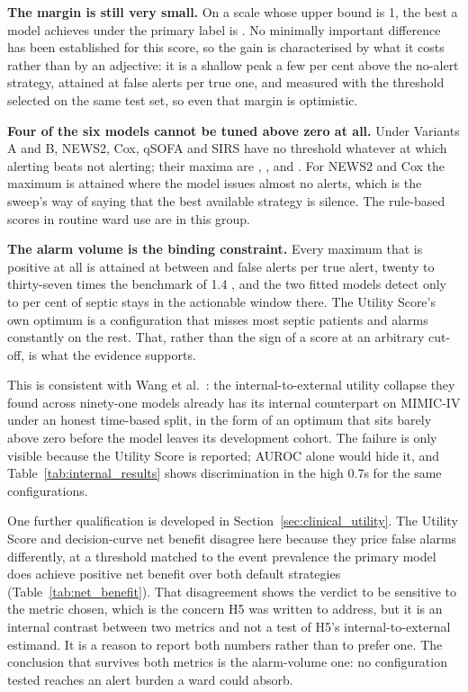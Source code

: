 \textbf{The margin is still very small.} On a scale whose upper bound is
1, the best a model achieves under the primary label is
\pcUtilityMaxGbtB{}. No minimally important difference has been established for
this score, so the gain is characterised by what it costs rather than by an
adjective: it is a shallow peak a few per cent above the no-alert strategy,
attained at \pcUtilityOptBurdenGbtB{} false alerts per true one, and measured
with the threshold selected on the same test set, so even that margin is
optimistic.

\textbf{Four of the six models cannot be tuned above zero at all.} Under
Variants A and B, NEWS2, Cox, qSOFA and SIRS have no threshold whatever at
which alerting beats not alerting; their maxima are
\pcUtilityMaxNewsB, \pcUtilityMaxCoxB, \pcUtilityMaxQsofaB{} and
\pcUtilityMaxSirsB. For NEWS2 and Cox the maximum is attained where the model
issues almost no alerts, which is the sweep's way of saying that the best
available strategy is silence. The rule-based scores in routine ward use are
in this group.

\textbf{The alarm volume is the binding constraint.} Every maximum that is
positive at all is attained at between \pcUtilityOptBurdenPrimaryC{} and
\pcUtilityOptBurdenGbtB{} false alerts per true alert, twenty to
thirty-seven times the benchmark of 1.4 \cite{moor2023review}, and the two
fitted models detect only \pcUtilityOptDetectPctPrimaryB{} to
\pcUtilityOptDetectPctGbtC{} per cent of septic stays in the actionable window
there. The Utility Score's own optimum is a configuration that misses most
septic patients and alarms constantly on the rest. That, rather than the sign
of a score at an arbitrary cut-off, is what the evidence supports.

This is consistent with Wang et al.\ \cite{wang2025srpm}: the
internal-to-external utility collapse they found across ninety-one models
already has its internal counterpart on MIMIC-IV under an honest time-based
split, in the form of an optimum that sits barely above zero before the model
leaves its development cohort. The failure is only visible because the Utility
Score is reported; AUROC alone would hide it, and Table~\ref{tab:internal_results}
shows discrimination in the high 0.7s for the same configurations.

One further qualification is developed in Section~\ref{sec:clinical_utility}.
The Utility Score and decision-curve net benefit disagree here because they
price false alarms differently, at a threshold matched to the event
prevalence the primary model does achieve positive net benefit over both
default strategies (Table~\ref{tab:net_benefit}). That disagreement shows the
verdict to be sensitive to the metric chosen, which is the concern H5 was
written to address, but it is an internal contrast between two metrics and not
a test of H5's internal-to-external estimand. It is a reason to report both
numbers rather than to prefer one. The
conclusion that survives both metrics is the alarm-volume one: no
configuration tested reaches an alert burden a ward could absorb.


